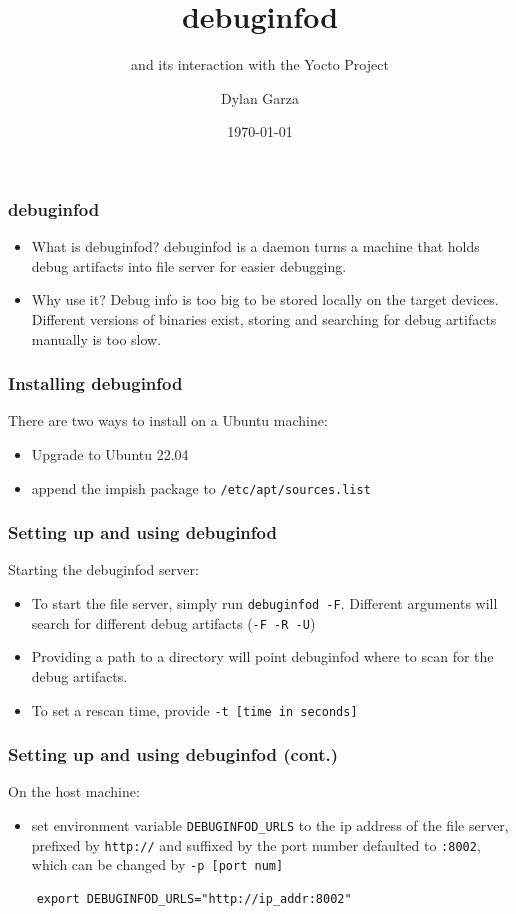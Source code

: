 \documentclass[12pt]{beamer}
\title{debuginfod}
\subtitle{and its interaction with the 
Yocto Project}
\author{Dylan Garza}
\date{\today}
\begin{document}
\frame{\titlepage}

\begin{frame}
   \frametitle{ debuginfod}
   \begin{itemize}
      \item What is debuginfod?
      debuginfod is a daemon turns a machine that
      holds debug artifacts into file server for
      easier debugging. \\
      \vspace{.5cm}
      \item Why use it?
      Debug info is too big to be stored locally
      on the target devices. Different versions 
      of binaries exist, storing and searching 
      for debug artifacts manually is too slow.
   \end{itemize}
\end{frame}

\begin{frame}[fragile]
   \frametitle{ Installing debuginfod}
   \vspace{-1cm}
   \noindent
   There are two ways to install on a Ubuntu machine:
   \begin{itemize}
      \item Upgrade to Ubuntu 22.04
      \item append the impish package to \verb|/etc/apt/sources.list|
   \end{itemize}
\end{frame}

\begin{frame}[fragile]
   \frametitle{Setting up and using debuginfod}
   \vspace{-1cm}
   Starting the debuginfod server:
   \begin{itemize}
      \item To start the file server, simply run \verb|debuginfod -F|. 
         Different arguments will search for different debug artifacts (\verb|-F -R -U|)
      \item Providing a path to a directory will point debuginfod where to scan for the debug artifacts.
      \item To set a rescan time, provide \verb|-t [time in seconds]|
   \end{itemize}
\end{frame}

\begin{frame}[fragile]
   \frametitle{ Setting up and using debuginfod (cont.)}
   \vspace{-1cm}
   On the host machine:
   \begin{itemize}
      \item set environment variable \verb|DEBUGINFOD_URLS| to the ip address 
         of the file server, prefixed by \verb|http://| and suffixed by the 
         port number defaulted to \verb|:8002|, which can be changed by \verb|-p [port num]|
   \end{itemize}
   \begin{verbatim}
    export DEBUGINFOD_URLS="http://ip_addr:8002"
    \end{verbatim}


\end{frame}
\end{document}
